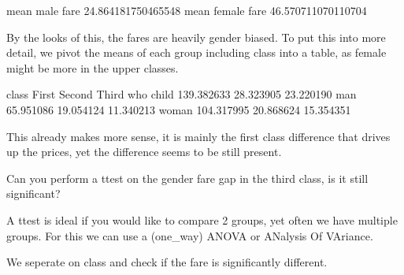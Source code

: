 \documentclass[letterpaper,10pt,english]{jupyterBook}
\begin{document}
\begin{sphinxVerbatim}[commandchars=\\\{\}]
mean male fare
24.864181750465548
mean female fare
46.570711070110704
\end{sphinxVerbatim}

\sphinxAtStartPar
By the looks of this, the fares are heavily gender biased.
To put this into more detail, we pivot the means of each group including class into a table, as female might be more in the upper classes.

\begin{sphinxVerbatim}[commandchars=\\\{\}]
\PYG{p}{[} \PYG{p}{]}
\end{sphinxVerbatim}

\begin{sphinxVerbatim}[commandchars=\\\{\}]
class       First     Second      Third
who                                    
child  139.382633  28.323905  23.220190
man     65.951086  19.054124  11.340213
woman  104.317995  20.868624  15.354351
\end{sphinxVerbatim}

\sphinxAtStartPar
This already makes more sense, it is mainly the first class difference that drives up the prices, yet the difference seems to be still present.

\sphinxAtStartPar
Can you perform a t\sphinxhyphen{}test on the gender fare gap in the third class, is it still significant?

\sphinxAtStartPar
A t\sphinxhyphen{}test is ideal if you would like to compare 2 groups, yet often we have multiple groups.
For this we can use a (one\_way) ANOVA or ANalysis Of VAriance.

\sphinxAtStartPar
We seperate on class and check if the fare is significantly different.

\begin{sphinxVerbatim}[commandchars=\\\{\}]
   
    \PYG{p}{[}\PYG{p}{]}
    \PYG{p}{[}\PYG{p}{]}
    \PYG{p}{[}\PYG{p}{]}
 
\end{sphinxVerbatim}
\end{document}
